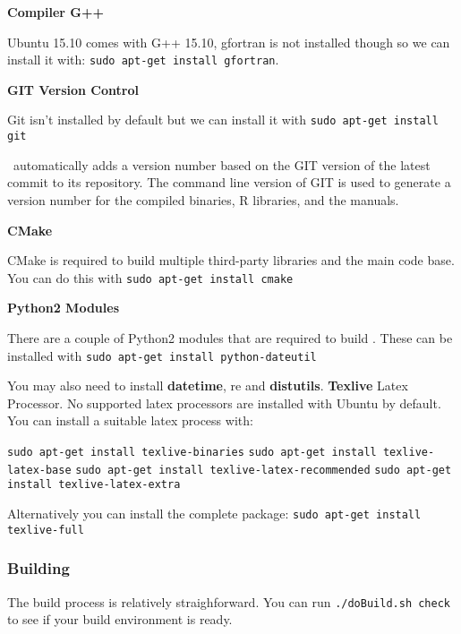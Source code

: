 \textbf{Compiler G++}

Ubuntu 15.10 comes with G++ 15.10, gfortran is not installed though so we can install it with: \texttt{sudo apt-get install gfortran}.

\textbf{GIT Version Control}

Git isn't installed by default but we can install it with \texttt{sudo apt-get install git}

\CNAME\ automatically adds a version number based on the GIT version of the latest commit to its repository. The command line version of GIT is used  to generate a version number for the compiled binaries, R libraries, and the manuals. 

\textbf{CMake}

CMake is required to build multiple third-party libraries and the main code base. You can do this with \texttt{sudo apt-get install cmake}

\textbf{Python2 Modules}

There are a couple of Python2 modules that are required to build \CNAME. These can be installed with \texttt{sudo apt-get install python-dateutil}

You may also need to install \textbf{datetime}, re and \textbf{distutils}. \textbf{Texlive} Latex Processor. No supported latex processors are installed with Ubuntu by default. You can install a suitable latex process with:

\texttt{sudo apt-get install texlive-binaries}
\texttt{sudo apt-get install texlive-latex-base}
\texttt{sudo apt-get install texlive-latex-recommended}
\texttt{sudo apt-get install texlive-latex-extra}

Alternatively you can install the complete package:
\texttt{sudo apt-get install texlive-full}

\subsubsection{Building \CNAME}

The build process is relatively straighforward. You can run \texttt{./doBuild.sh check} to see if your build environment is ready.

